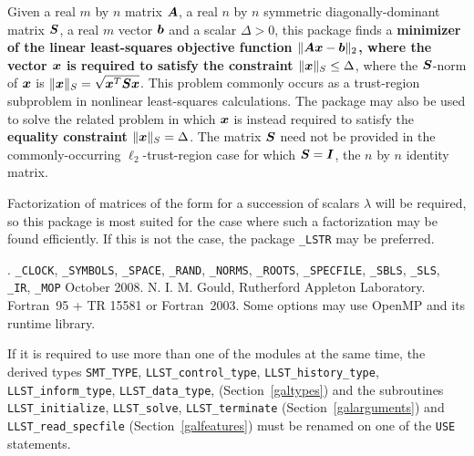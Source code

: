 \documentclass{galahad}
\newcommand{\packagename}{LLST}
\newcommand{\fullpackagename}{\libraryname\_\packagename}
\begin{document}
\galheader


\galsummary
Given a real $m$ by $n$ matrix ${\bm{A}}$,
a real $n$ by $n$ symmetric diagonally-dominant matrix ${\bm{S}}$,
a real $m$ vector ${\bm{b}}$ and a scalar $\Delta>0$, this package finds a
{\bf minimizer of the linear least-squares objective function
$\| {\bm{A}} {\bm{x}}  - {\bm{b}} \|_2$, where the vector ${\bm{x}}$ is
required to satisfy the constraint $\|{\bm{x}}\|_S \leq  \Delta$},
where the ${\bm{S}}$-norm of ${\bm{x}}$ is $\|{\bm{x}}\|_S = \sqrt{{\bm{x}}^T {\bm{S}} {\bm{x}}}$.
This problem commonly occurs as a trust-region subproblem in nonlinear
least-squares calculations.
The package may also be used to solve the related problem in which ${\bm{x}}$ is
instead required to satisfy the
{\bf equality constraint $\|{\bm{x}}\|_S = \Delta$}.
The matrix ${\bm{S}}$ need not be provided in the commonly-occurring
$\ell_2$-trust-region case for which ${\bm{S}} = {\bm{I}}$, the $n$ by $n$
identity matrix.

\noindent
Factorization of matrices of the form
for a succession
of scalars $\lambda$ will be required, so this package is most suited
for the case where such a factorization may be found efficiently. If
this is not the case, the package {\tt \libraryname\_LSTR} may be preferred.


\galattributes
\galversions{\tt  \fullpackagename\_single, \fullpackagename\_double}.
\galuses
{\tt \libraryname\_CLOCK},
{\tt \libraryname\_SY\-M\-BOLS},
{\tt \libraryname\_SPACE}, {\tt \libraryname\_\-RAND},
{\tt \libraryname\_\-NORMS},
{\tt \libraryname\_ROOTS}, {\tt \libraryname\_SPECFILE},
{\tt \libraryname\_SBLS},
{\tt \libraryname\_SLS}, {\tt \libraryname\_IR},
{\tt \libraryname\_MOP}
\galdate October 2008.
\galorigin N. I. M. Gould, Rutherford Appleton Laboratory.
\gallanguage Fortran~95 + TR 15581 or Fortran~2003.
\galparallelism Some options may use OpenMP and its runtime library.


\galhowto



\noindent
If it is required to use more than one of the modules at the same time, 
the derived types
{\tt SMT\_TYPE},
{\tt \packagename\_control\_type},
{\tt \packagename\_history\_\-type},
{\tt \packagename\_inform\_type},
{\tt \packagename\_data\_type},
(Section~\ref{galtypes})
and the subroutines
{\tt \packagename\_initialize},
{\tt \packagename\_solve}, {\tt \packagename\_\-terminate}
(Section~\ref{galarguments})
and
{\tt \packagename\_read\_specfile}
(Section~\ref{galfeatures})
must be renamed on one of the {\tt USE} statements.
\end{document}

